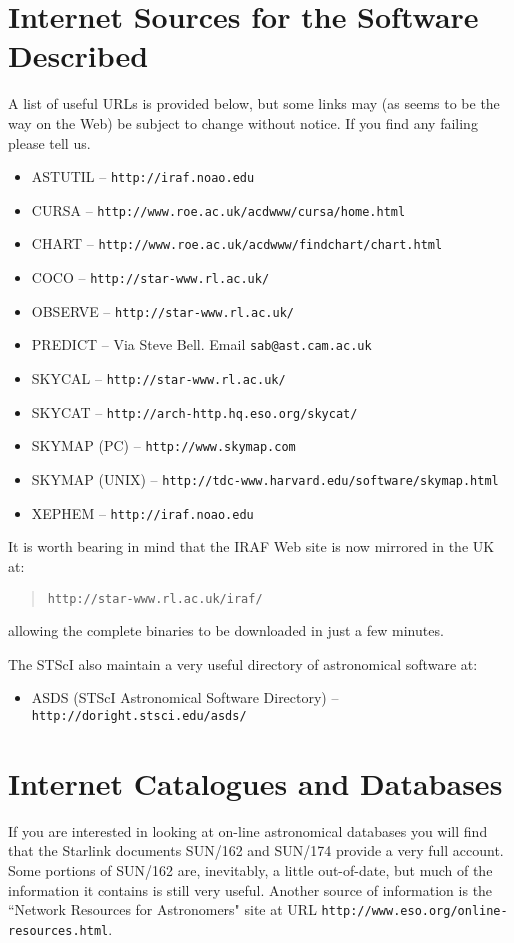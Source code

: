 \documentclass[twoside,11pt]{article}
\newcommand{\htmladdnormallink}[2]{#1}
\newcommand{\xref}[3]{#1}
\newcommand{\xlabel}[1]{}
\newcommand{\IRAFref}{\htmladdnormallink{IRAF}{http://star-www.rl.ac.uk/iraf/}}
\newcommand{\SUNCATref}{\xref{SUN/162}{sun162}{}}
\newcommand{\SUNCATBref}{\xref{SUN/174}{sun174}{}}
\newcommand{\HTTPAref}{\htmladdnormallink{\tt http://star-www.rl.ac.uk/}{http://star-www.rl.ac.uk/}}
\newcommand{\HTTPBref}{\htmladdnormallink{\tt http://iraf.noao.edu}{http://iraf.noao.edu}}
\newcommand{\HTTPCref}{\htmladdnormallink{\tt http://www.skymap.com}{http://www.skymap.com}}
\newcommand{\HTTPMref}{\htmladdnormallink{\tt http://arch-http.hq.eso.org/skycat/}{http://arch-http.hq.eso.org/skycat/}}
\newcommand{\HTTPNref}{\htmladdnormallink{\tt http://tdc-www.harvard.edu/software/skymap.html}{http://tdc-www.harvard.edu/software/skymap.html}}
\newcommand{\HTTPOref}{\htmladdnormallink{\tt http://doright.stsci.edu/asds/}{http://doright.stsci.edu/asds/}}
\newcommand{\HTTPBDref}{\htmladdnormallink{\tt http://www.roe.ac.uk/acdwww/cursa/home.html}{http://www.roe.ac.uk/acdwww/cursa/home.html}}
\newcommand{\HTTPBEref}{\htmladdnormallink{\tt http://www.roe.ac.uk/acdwww/findchart/chart.html}{http://www.roe.ac.uk/acdwww/findchart/chart.html}}
\newcommand{\HTTPBFref}{\htmladdnormallink{\tt http://www.eso.org/online-resources.html}{http://www.eso.org/online-resources.html}}
\begin{document}
\section{Internet Sources for the Software Described} \xlabel{SOURCESSOFT}
\label{sec:sourcessoft}
 
A list of useful URLs is provided below, but some links may (as seems to be
the way on the Web) be subject to change without notice. If you find any
failing please tell us. 

\begin{itemize}
\item ASTUTIL -- {\HTTPBref} 
\item CURSA --  {\HTTPBDref}
\item CHART -- {\HTTPBEref}
\item COCO -- {\HTTPAref}
\item OBSERVE -- {\HTTPAref}             
\item PREDICT -- Via Steve Bell. Email {\tt sab@ast.cam.ac.uk}          
\item SKYCAL -- {\HTTPAref}         
\item SKYCAT -- {\HTTPMref}   
\item SKYMAP (PC) -- {\HTTPCref} 
\item SKYMAP (UNIX) -- {\HTTPNref} 
\item XEPHEM -- {\HTTPBref} 
\end{itemize}

It is worth bearing in mind that the {\IRAFref} Web site is now mirrored 
in the UK at:
\begin{quote}
{\tt http://star-www.rl.ac.uk/iraf/}
\end{quote}
allowing the complete binaries to be downloaded in just a few minutes. 

The STScI also maintain a very useful directory of astronomical software at:

\begin{itemize}
\item ASDS (STScI Astronomical Software Directory) -- {\HTTPOref} 
\end{itemize}

\section{Internet Catalogues and Databases} \xlabel{CATALOGUE}
\label{sec:catalogue}
 
If you are interested in looking at on-line astronomical databases you
will find that the Starlink documents {\SUNCATref} and {\SUNCATBref} provide a very full account. 
Some portions of SUN/162 are, inevitably, a little out-of-date, but much of the information
it contains is still very useful. Another source of information is
the ``Network Resources for Astronomers" site at URL
{\HTTPBFref}.
\end{document}
